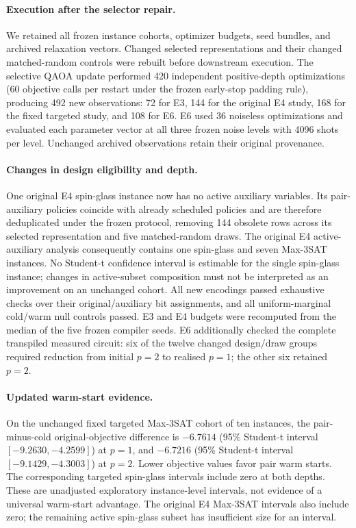 \paragraph{Execution after the selector repair.}
We retained all frozen instance cohorts, optimizer budgets, seed bundles, and
archived relaxation vectors. Changed selected representations and their changed
matched-random controls were rebuilt before downstream execution. The selective
QAOA update performed 420 independent positive-depth optimizations (60 objective
calls per restart under the frozen early-stop padding rule), producing 492 new
observations: 72 for E3, 144 for the original E4 study, 168 for the fixed targeted
study, and 108 for E6. E6 used 36 noiseless optimizations and evaluated each
parameter vector at all three frozen noise levels with 4096 shots per level.
Unchanged archived observations retain their original provenance.

\paragraph{Changes in design eligibility and depth.}
One original E4 spin-glass instance now has no active auxiliary variables.
Its pair-auxiliary policies coincide with already scheduled policies and are
therefore deduplicated under the frozen protocol, removing 144 obsolete rows
across its selected representation and five matched-random draws.
The original E4 active-auxiliary analysis consequently contains one spin-glass
and seven Max-3SAT instances. No Student-t confidence interval is estimable for
the single spin-glass instance; changes in active-subset composition must not
be interpreted as an improvement on an unchanged cohort.
All new encodings passed exhaustive checks over their original/auxiliary bit
assignments, and all uniform-marginal cold/warm null controls passed.
E3 and E4 budgets were recomputed from the median of the five frozen compiler
seeds. E6 additionally checked the complete transpiled measured circuit: six
of the twelve changed design/draw groups required reduction from initial
$p=2$ to realised $p=1$; the other six retained $p=2$.

\paragraph{Updated warm-start evidence.}
On the unchanged fixed targeted Max-3SAT cohort of ten instances, the
pair-minus-cold original-objective difference is $-6.7614$ (95\% Student-t interval $[-9.2630,-4.2599]$) at $p=1$,
and $-6.7216$ (95\% Student-t interval $[-9.1429,-4.3003]$) at $p=2$. Lower objective values favor pair warm starts.
The corresponding targeted spin-glass intervals include zero at both depths.
These are unadjusted exploratory instance-level intervals, not evidence of a
universal warm-start advantage. The original E4 Max-3SAT intervals also include
zero; the remaining active spin-glass subset has insufficient size for an interval.

% 
% 
